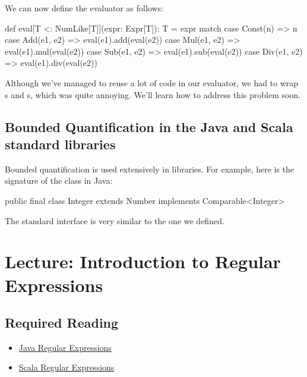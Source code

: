 \documentclass[9pt]{extbook}
\begin{document}
We can now define the evaluator as follows:

\begin{scalacode}
def eval[T <: NumLike[T]](expr: Expr[T]): T = expr match {
  case Const(n) => n
  case Add(e1, e2) => eval(e1).add(eval(e2))
  case Mul(e1, e2) => eval(e1).mul(eval(e2))
  case Sub(e1, e2) => eval(e1).sub(eval(e2))
  case Div(e1, e2) => eval(e1).div(eval(e2))
}
\end{scalacode}

Although we've managed to reuse a lot of code in our evaluator,
we had to wrap s and s, which was
quite annoying. We'll learn how to address this problem soon.

\section{Bounded Quantification in the Java and Scala standard libraries}

Bounded quantification is used extensively in libraries. For example,
here is the signature of the  class in Java:

\begin{scalacode}
public final class Integer extends Number implements Comparable<Integer>
\end{scalacode}

The standard  interface is very similar to the one we
defined.

\chapter{Lecture: Introduction to Regular Expressions}

\section{Required Reading}

\begin{itemize}

\item \href{http://docs.oracle.com/javase/7/docs/api/java/util/regex/Pattern.html}{Java Regular Expressions}

\item \href{http://www.scala-lang.org/api/current/index.html#scala.util.matching.Regex}{Scala Regular Expressions}

\end{itemize}
\end{document}
